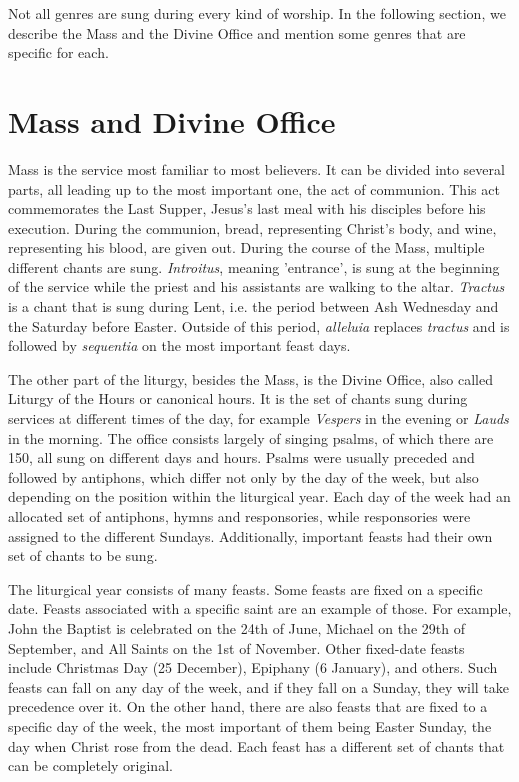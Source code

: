 Not all genres are sung during every kind of worship. In the following section, we describe the Mass and the Divine Office and mention some genres
that are specific for each.

\section{Mass and Divine Office}

Mass is the service most familiar to most believers.
It can be divided into several parts, all leading up to the most important one, the act of communion. This act commemorates the Last Supper,
Jesus's last meal with his disciples before his execution. During the communion, bread, representing Christ's body, and wine, representing his
blood, are given out. During the course of the Mass, multiple different chants are sung. \emph{Introitus}, meaning 'entrance', is sung at the beginning
of the service while the priest and his assistants are walking to the altar. \emph{Tractus} is a chant that is sung during Lent, i.e. the period
between Ash Wednesday and the Saturday before Easter. Outside of this period, \emph{alleluia} replaces \emph{tractus} and is followed by \emph{sequentia}
on the most important feast days.

The other part of the liturgy, besides the Mass, is the Divine Office, also called Liturgy of the Hours or canonical hours. It is the set of chants
sung during services at different times of the day, for example \emph{Vespers} in the evening or \emph{Lauds} in the morning. The office consists
largely of singing psalms, of which there are 150, all sung on different days and hours. Psalms were usually preceded and followed by antiphons,
which differ not only by the day of the week, but also depending on the position within the liturgical year. Each day of the week had an allocated
set of antiphons, hymns and responsories, while responsories were assigned to the different Sundays. Additionally, important feasts had their own
set of chants to be sung.

The liturgical year consists of many feasts. Some feasts are fixed on a specific date. Feasts associated with a specific saint are an example of those.
For example, John the Baptist is celebrated on the 24th of June, Michael on the 29th of September, and All Saints on the 1st of November. Other
fixed-date feasts include Christmas Day (25 December), Epiphany (6 January), and others. Such feasts can fall on any day of the week, and if they fall
on a Sunday, they will take precedence over it. On the other hand, there are also feasts that are fixed to a specific day of the week, the most important
of them being Easter Sunday, the day when Christ rose from the dead. Each feast has a different set of chants that can be completely original.

